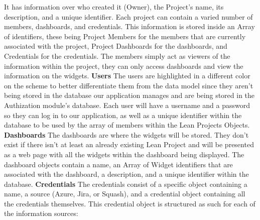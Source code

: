 \documentclass[a4paper,twoside,10pt]{report}
\begin{document}
\newline
It has information over who created it (Owner), the Project's name, its description, and a unique identifier.
\newline
Each project can contain a varied number of members, dashboards, and credentials. 
\newline
This information is stored inside an Array of identifiers, these being Project Members for the members that are currently associated with the project, Project Dashboards for the dashboards, and Credentials for the credentials.
\newline
The members simply act as viewers of the information within the project, they can only access dashboards and view the information on the widgets.
\newline
\newline
\textbf{Users}
\newline
The users are highlighted in a different color on the scheme to better differentiate them from the data model since they aren't being stored in the database our application manages and are being stored in the Authization module's database.
\newline
Each user will have a username and a password so they can log in to our application, as well as a unique identifier within the database to be used by the array of members within the Lean Projects Objects.
\newline
\newline
\textbf{Dashboards}
\newline
The dashboards are where the widgets will be stored. They don't exist if there isn't at least an already existing Lean Project and will be presented as a web page with all the widgets within the dashboard being displayed.
\newline
The dashboard objects contain a name, an Array of Widget identifiers that are associated with the dashboard, a description, and a unique identifier within the database.
\newline
\newline
\textbf{Credentials}
\newline
The credentials consist of a specific object containing a name, a source (Azure, Jira, or Squash), and a credential object containing all the credentials themselves.
\newline
This credential object is structured as such for each of the information sources:
\newline
\end{document}
